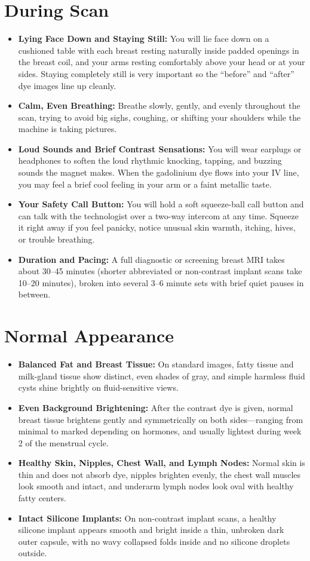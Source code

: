 \section{During Scan}
\begin{itemize}
\item \textbf{Lying Face Down and Staying Still:} You will lie face down on a cushioned table with each breast resting naturally inside padded openings in the breast coil, and your arms resting comfortably above your head or at your sides. Staying completely still is very important so the ``before'' and ``after'' dye images line up cleanly.
\item \textbf{Calm, Even Breathing:} Breathe slowly, gently, and evenly throughout the scan, trying to avoid big sighs, coughing, or shifting your shoulders while the machine is taking pictures.
\item \textbf{Loud Sounds and Brief Contrast Sensations:} You will wear earplugs or headphones to soften the loud rhythmic knocking, tapping, and buzzing sounds the magnet makes. When the gadolinium dye flows into your IV line, you may feel a brief cool feeling in your arm or a faint metallic taste.
\item \textbf{Your Safety Call Button:} You will hold a soft squeeze-ball call button and can talk with the technologist over a two-way intercom at any time. Squeeze it right away if you feel panicky, notice unusual skin warmth, itching, hives, or trouble breathing.
\item \textbf{Duration and Pacing:} A full diagnostic or screening breast MRI takes about 30--45 minutes (shorter abbreviated or non-contrast implant scans take 10--20 minutes), broken into several 3--6 minute sets with brief quiet pauses in between.
\end{itemize}

\section{Normal Appearance}
\begin{itemize}
\item \textbf{Balanced Fat and Breast Tissue:} On standard images, fatty tissue and milk-gland tissue show distinct, even shades of gray, and simple harmless fluid cysts shine brightly on fluid-sensitive views.
\item \textbf{Even Background Brightening:} After the contrast dye is given, normal breast tissue brightens gently and symmetrically on both sides---ranging from minimal to marked depending on hormones, and usually lightest during week 2 of the menstrual cycle.
\item \textbf{Healthy Skin, Nipples, Chest Wall, and Lymph Nodes:} Normal skin is thin and does not absorb dye, nipples brighten evenly, the chest wall muscles look smooth and intact, and underarm lymph nodes look oval with healthy fatty centers.
\item \textbf{Intact Silicone Implants:} On non-contrast implant scans, a healthy silicone implant appears smooth and bright inside a thin, unbroken dark outer capsule, with no wavy collapsed folds inside and no silicone droplets outside.
\end{itemize}

